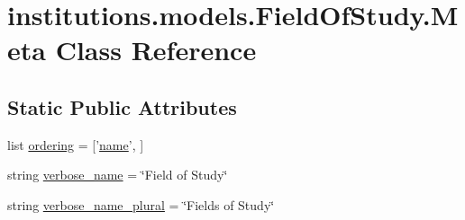 \hypertarget{classinstitutions_1_1models_1_1_field_of_study_1_1_meta}{\section{institutions.\-models.\-Field\-Of\-Study.\-Meta Class Reference}
\label{classinstitutions_1_1models_1_1_field_of_study_1_1_meta}
}
\subsection*{Static Public Attributes}
\begin{DoxyCompactItemize}
\item 
list \hyperlink{classinstitutions_1_1models_1_1_field_of_study_1_1_meta_a82dfeecfc18d43b0964559fb88a7dfdf}{ordering} = \mbox{[}'\hyperlink{classinstitutions_1_1models_1_1_field_of_study_ae9f06655cdd3585c9768d191284e3ba8}{name}', \mbox{]}
\item 
string \hyperlink{classinstitutions_1_1models_1_1_field_of_study_1_1_meta_ae9cdf056adc0c43a1ade826f5323a1df}{verbose\-\_\-name} = \char`\"{}Field of Study\char`\"{}
\item 
string \hyperlink{classinstitutions_1_1models_1_1_field_of_study_1_1_meta_a6ea5a77958c4fb17771e3d02e59de277}{verbose\-\_\-name\-\_\-plural} = \char`\"{}Fields of Study\char`\"{}
\end{DoxyCompactItemize}


